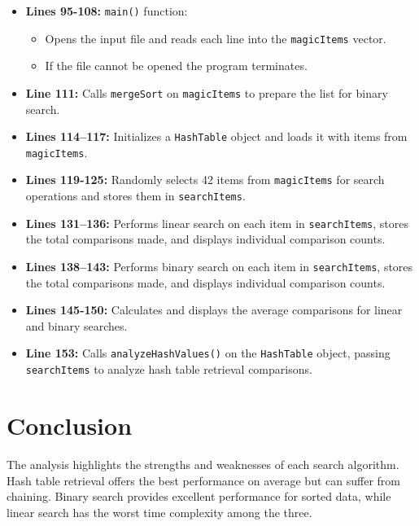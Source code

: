 \documentclass{article}
\begin{document}
\begin{itemize}
    \item \textbf{Lines 95-108:} \texttt{main()} function:
        \begin{itemize}
            \item Opens the input file and reads each line into the \texttt{magicItems} vector.
            \item If the file cannot be opened the program terminates.
        \end{itemize}

    \item \textbf{Line 111:} Calls \texttt{mergeSort} on \texttt{magicItems} to prepare the list for binary search.

    \item \textbf{Lines 114--117:} Initializes a \texttt{HashTable} object and loads it with items from \texttt{magicItems}.

    \item \textbf{Lines 119-125:} Randomly selects 42 items from \texttt{magicItems} for search operations and stores them in \texttt{searchItems}.

    \item \textbf{Lines 131--136:} Performs linear search on each item in \texttt{searchItems}, stores the total comparisons made, and displays individual comparison counts.

    \item \textbf{Lines 138--143:} Performs binary search on each item in \texttt{searchItems}, stores the total comparisons made, and displays individual comparison counts.

    \item \textbf{Lines 145-150:} Calculates and displays the average comparisons for linear and binary searches.

    \item \textbf{Line 153:} Calls \texttt{analyzeHashValues()} on the \texttt{HashTable} object, passing \texttt{searchItems} to analyze hash table retrieval comparisons.
\end{itemize}


\section{Conclusion}
The analysis highlights the strengths and weaknesses of each search algorithm. Hash table retrieval offers the best performance on average but can suffer from chaining. Binary search provides excellent performance for sorted data, while linear search has the worst time complexity among the three.
\end{document}
